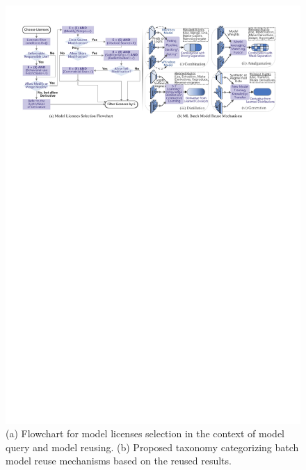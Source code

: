 \begin{figure}[t]
    \centering
    \includegraphics[width=\linewidth]{fig/flowchart.pdf}
    \vspace{-5mm}
    \caption{(a) Flowchart for model licenses selection in the context of model query and model reusing. (b) Proposed taxonomy categorizing batch model reuse mechanisms based on the reused results.}
    \label{fig:flowchart}
    \vspace{-4mm}
\end{figure}

